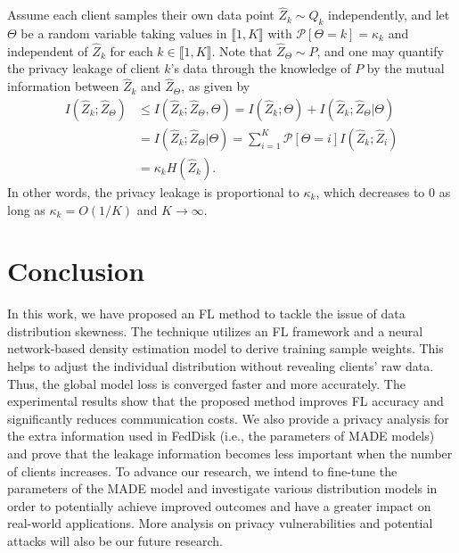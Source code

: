\documentclass[journal]{IEEEtai}
\newcommand{\MethodnameShort}{FedDisk}
\newcommand{\prob}{\mathcal{P} }
\begin{document}
Assume each client samples their own data point ${\hat Z}_k \sim Q_k$ independently, and let  $\Theta$ be a random variable taking values in $\llbracket 1,K \rrbracket$ with $\prob[\Theta = k] = \kappa_k$ and independent of ${\hat Z}_k$ for each $k \in \llbracket 1,K \rrbracket$. Note that ${\hat Z}_\Theta \sim P$, and one may quantify the privacy leakage of client $k$'s data through the knowledge of $P$ by the mutual  information between ${\hat Z}_k$ and ${\hat Z}_\Theta$, as given by
\begin{equation}
	\begin{aligned}
		I({\hat Z}_k;{\hat Z}_\Theta) & \leq I({\hat Z}_k;{\hat Z}_\Theta, \Theta)
		=  I({\hat Z}_k; \Theta) + I({\hat Z}_k;{\hat Z}_\Theta | \Theta)\\
		&= I({\hat Z}_k;{\hat Z}_\Theta | \Theta) = \sum_{i=1}^K \prob[\Theta = i] I({\hat Z}_k;{\hat Z}_i) \\
		&= \kappa_k H({\hat Z}_k).
	\end{aligned}
\end{equation}
%
In other words, the privacy leakage is proportional to $\kappa_k$, which decreases to $0$ as long as $\kappa_k = O(1/K)$ and $K \rightarrow \infty$.



\section{Conclusion}
\label{sec:conclusion}
In this work, we have proposed an FL method to tackle the issue of data distribution skewness. The technique utilizes an FL framework and a neural network-based density estimation model to derive training sample weights. This helps to adjust the individual distribution without revealing clients' raw data. Thus, the global model loss is converged faster and more accurately. The experimental results show that the proposed method improves FL accuracy and significantly reduces communication costs. We also provide a privacy analysis for the extra information used in \MethodnameShort{} (i.e., the parameters of MADE models) and prove that the leakage information becomes less important when the number of clients increases. To advance our research, we intend to fine-tune the parameters of the MADE model and investigate various distribution models in order to potentially achieve improved outcomes and have a greater impact on real-world applications. More analysis on privacy vulnerabilities and potential attacks will also be our future research.
\end{document}

